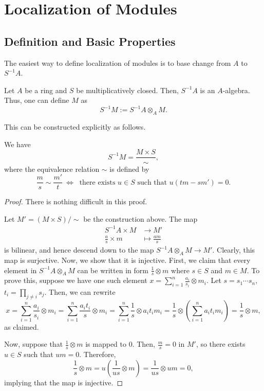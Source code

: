 \section{Localization of Modules}
\subsection{Definition and Basic Properties}
The easiest way to define localization of modules
is to base change from $A$ to $S^{-1}A$.
\begin{definition}
    Let $A$ be a ring and $S$ be multiplicatively closed.
    Then, $S^{-1}A$ is an $A$-algebra.
    Thus, one can define  $M$
    as
    $$S^{-1}M := S^{-1}A\otimes_A M.$$
\end{definition}
This can be constructed explicitly as follows.
\begin{proposition}
    We have
    $$S^{-1}M = \frac{M\times S}{\sim},$$
    where the equivalence relation $\sim$ is defined by 
    $$\frac ms \sim\frac{m'}t\ \iff\ \text{ there exists } 
    u\in S\text{ such that } u(tm-sm')=0.$$
\end{proposition}
\begin{proof}
    There is nothing difficult in this proof.

    Let $M' = (M\times S)/\sim$ be the construction above.
    The map
    \begin{align*}
        S^{-1}A \times M &\to M' \\
        \frac as \times m &\mapsto \frac{am}s
    \end{align*}
    is bilinear, and hence descend down to the map
    $S^{-1}A\otimes_A M \to M'$. Clearly, this map is surjective.
    Now, we show that it is injective.
    First, we claim that every element in $S^{-1}A\otimes_A M$
    can be written in form $\tfrac 1s\otimes m$
    where $s\in S$ and $m\in M$. To prove this, suppose 
    we have one such element $x=\sum_{i=1}^n \tfrac{a_i}{s_i}
    \otimes m_i$. Let $s = s_1\cdots s_n$,
    $t_i = \prod_{j\neq i} s_j$. Then, we can rewrite
    $$x=\sum_{i=1}^n \frac{a_i}{s_i}\otimes m_i
    = \sum_{i=1}^n \frac{a_it_i}s \otimes m_i 
    = \sum_{i=1}^n \frac 1s \otimes a_it_im_i 
    = \frac 1s \otimes \left(\sum_{i=1}^n a_it_im_i\right)
    = \frac 1s\otimes m,$$
    as claimed.

    Now, suppose that $\frac 1s\otimes m$ is mapped to $0$.
    Then, $\tfrac ms = 0$ in $M'$, so there exists $u\in S$
    such that $um=0$. Therefore,
    $$\frac 1s \otimes m = u\left(\frac 1{us}\otimes m\right)
    = \frac 1{us}\otimes um = 0,$$
    implying that the map is injective.
\end{proof}

